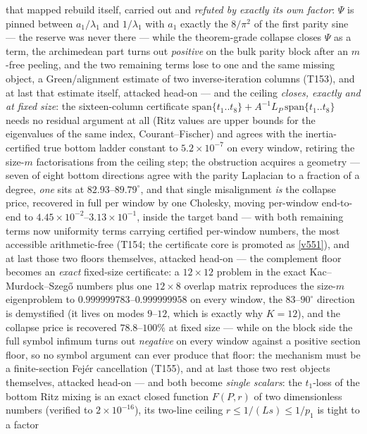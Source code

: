 \documentclass[11pt,a4paper]{article}
\begin{document}
that mapped rebuild itself, carried out and \emph{refuted by exactly its own factor}: $\Psi$
is pinned between $a_1/\lambda_1$ and $1/\lambda_1$ with $a_1$ exactly the $8/\pi^2$ of the
first parity sine --- the reserve was never there --- while the theorem-grade collapse closes
$\Psi$ as a term, the archimedean part turns out \emph{positive} on the bulk parity block
after an $m$-free peeling, and the two remaining terms lose to one and the same missing
object, a Green/alignment estimate of two inverse-iteration columns (T153), and at last
that estimate itself, attacked head-on --- and the ceiling \emph{closes, exactly and at
fixed size}: the sixteen-column certificate
$\mathrm{span}\{t_1..t_8\}+A^{-1}L_P\,\mathrm{span}\{t_1..t_8\}$ needs no residual argument
at all (Ritz values are upper bounds for the eigenvalues of the same index,
Courant--Fischer) and agrees with the inertia-certified true bottom ladder constant to
$5.2\times10^{-7}$ on every window, retiring the size-$m$ factorisations from the ceiling
step; the obstruction acquires a geometry --- seven of eight bottom directions agree with
the parity Laplacian to a fraction of a degree, \emph{one} sits at
$82.93$--$89.79^\circ$, and that single misalignment \emph{is} the collapse price,
recovered in full per window by one Cholesky, moving per-window end-to-end to
$4.45\times10^{-2}$--$3.13\times10^{-1}$, inside the target band --- with both remaining
terms now uniformity terms carrying certified per-window numbers, the most accessible
arithmetic-free (T154; the certificate core is promoted as \vref{v551}), and at last those
two floors themselves, attacked head-on --- the complement floor becomes an \emph{exact}
fixed-size certificate: a $12\times12$ problem in the exact Kac--Murdock--Szeg\H{o} numbers
plus one $12\times8$ overlap matrix reproduces the size-$m$ eigenproblem to
$0.999999783$--$0.999999958$ on every window, the $83$--$90^\circ$ direction is demystified
(it lives on modes $9$--$12$, which is exactly why $K=12$), and the collapse price is
recovered $78.8$--$100\%$ at fixed size --- while on the block side the full symbol
infimum turns out \emph{negative} on every window against a positive section floor, so no
symbol argument can ever produce that floor: the mechanism must be a finite-section
Fej\'er cancellation (T155), and at last those two rest objects themselves, attacked
head-on --- and both become \emph{single scalars}: the $t_1$-loss of the bottom Ritz
mixing is an exact closed function $F(P,r)$ of two dimensionless numbers (verified to
$2\times10^{-16}$), its two-line ceiling $r\le1/(Ls)\le1/p_1$ is tight to a factor
\end{document}
